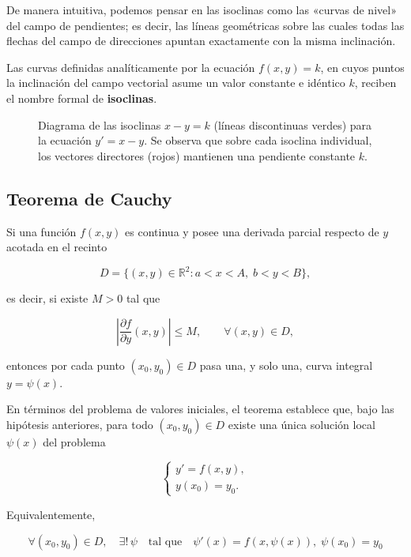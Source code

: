 De manera intuitiva, podemos pensar en las isoclinas como las «curvas de nivel» del campo de pendientes; es decir, las líneas geométricas sobre las cuales todas las flechas del campo de direcciones apuntan exactamente con la misma inclinación.

\begin{definicion}[Isoclina]
Las curvas definidas analíticamente por la ecuación $f(x,y) = k$, en cuyos puntos la inclinación del campo vectorial asume un valor constante e idéntico $k$, reciben el nombre formal de \textbf{isoclinas}.
\end{definicion}

\begin{figure}[H]
    \centering
    
    \caption{Diagrama de las isoclinas $x-y=k$ (líneas discontinuas verdes) para la ecuación $y'=x-y$. Se observa que sobre cada isoclina individual, los vectores directores (rojos) mantienen una pendiente constante $k$.}
\end{figure}

\subsection{Teorema de Cauchy}
\begin{teorema}
Si una función $f(x,y)$ es continua y posee una derivada parcial respecto de $y$ acotada en el recinto

$$
D=\{(x,y)\in\mathbb{R}^2:a<x<A,\;b<y<B\},
$$

es decir, si existe $M>0$ tal que

$$
\left|\frac{\partial f}{\partial y}(x,y)\right|\leq M,
\qquad \forall (x,y)\in D,
$$

entonces por cada punto $(x_0,y_0)\in D$ pasa una, y solo una, curva integral $y=\psi(x)$.
\end{teorema}

En términos del problema de valores iniciales, el teorema establece que, bajo las hipótesis anteriores, para todo $(x_0,y_0)\in D$ existe una única solución local $\psi(x)$ del problema

$$
\begin{cases}
y'=f(x,y),\\
y(x_0)=y_0.
\end{cases}
$$

Equivalentemente,

$$
\boxed{
\forall (x_0,y_0)\in D,\quad
\exists!\,\psi
\quad\text{tal que}\quad
\psi'(x)=f(x,\psi(x)),\;\psi(x_0)=y_0
}
$$

